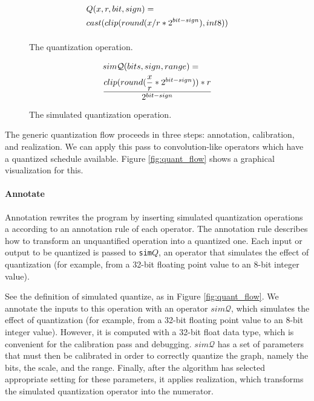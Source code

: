 \begin{figure}[h]
    \begin{equation}
      \begin{aligned}[b]
        \scriptscriptstyle
        & Q(x, r, bit, sign) =\\ & cast(clip(round(x/r*2^{bit-sign}), int8)) \\
      \end{aligned}
    \end{equation}
    \caption{The quantization operation.}
    \label{fig:quant_op}
    \begin{equation}
      \begin{aligned}[b]
        \scriptscriptstyle
        & sim\mathcal{Q}(bits, sign, range) =\\ & \dfrac{clip(round(\dfrac{x}{r} * 2^{bit - sign})) * r}{2^{bit - sign}}
      \end{aligned}
    \end{equation}
    \caption{The simulated quantization operation.}
    \label{fig:sim_quant_op}
\end{figure}

The generic quantization flow proceeds in three steps: annotation, calibration, and realization. We
can apply this pass to convolution-like operators which have a quantized schedule
available. Figure \ref{fig:quant_flow} shows a graphical visualization for this.

\paragraph{Annotate}

Annotation rewrites the program by inserting simulated quantization operations a
  according to an annotation rule of each operator.
The annotation rule describes how to transform an unquantified operation
  into a quantized one.
Each input or output to be quantized is passed to \texttt{sim$Q$},
  an operator that simulates the effect of quantization (for example, from a 32-bit
  floating point value to an 8-bit integer value).

See the definition of simulated quantize, as in Figure \ref{fig:quant_flow}.
We annotate the inputs to this operation with an operator $sim\mathcal{Q}$,
  which simulates the effect of quantization (for example, from a 32-bit
  floating point value to an 8-bit integer value).
However, it is computed with a 32-bit float data type, which is convenient for the
  calibration pass and debugging.
$sim\mathcal{Q}$ has a set of parameters that must then be calibrated in order to
correctly quantize the graph, namely the bits, the scale, and the range.
Finally, after the algorithm has selected
  appropriate setting for these parameters, it applies realization,
  which transforms the simulated quantization operator into the numerator.

